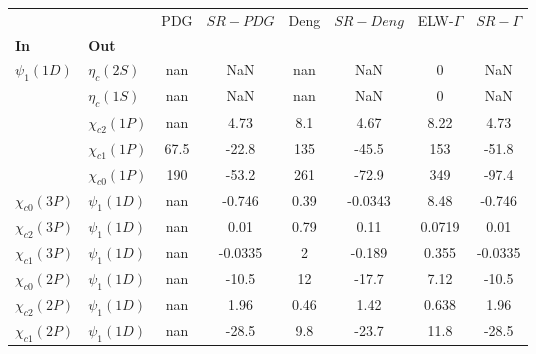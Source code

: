\begin{tabular}{l|l|c|c|c|c|c|c}
\toprule
                &                &  PDG & $SR-PDG$ &  Deng & $SR-Deng$ &  ELW-$\Gamma$ & $SR-\Gamma$ \\
\textbf{In} & \textbf{Out} &      &          &       &           &               &             \\
\midrule
\textbf{$\psi_{1}(1D)$} & \textbf{$\eta_{c}(2S)$} &  nan &      NaN &   nan &       NaN &             0 &         NaN \\
                & \textbf{$\eta_{c}(1S)$} &  nan &      NaN &   nan &       NaN &             0 &         NaN \\
                & \textbf{$\chi_{c2}(1P)$} &  nan &     4.73 &   8.1 &      4.67 &          8.22 &        4.73 \\
                & \textbf{$\chi_{c1}(1P)$} & 67.5 &    -22.8 &   135 &     -45.5 &           153 &       -51.8 \\
                & \textbf{$\chi_{c0}(1P)$} &  190 &    -53.2 &   261 &     -72.9 &           349 &       -97.4 \\
\textbf{$\chi_{c0}(3P)$} & \textbf{$\psi_{1}(1D)$} &  nan &   -0.746 &  0.39 &   -0.0343 &          8.48 &      -0.746 \\
\textbf{$\chi_{c2}(3P)$} & \textbf{$\psi_{1}(1D)$} &  nan &     0.01 &  0.79 &      0.11 &        0.0719 &        0.01 \\
\textbf{$\chi_{c1}(3P)$} & \textbf{$\psi_{1}(1D)$} &  nan &  -0.0335 &     2 &    -0.189 &         0.355 &     -0.0335 \\
\textbf{$\chi_{c0}(2P)$} & \textbf{$\psi_{1}(1D)$} &  nan &    -10.5 &    12 &     -17.7 &          7.12 &       -10.5 \\
\textbf{$\chi_{c2}(2P)$} & \textbf{$\psi_{1}(1D)$} &  nan &     1.96 &  0.46 &      1.42 &         0.638 &        1.96 \\
\textbf{$\chi_{c1}(2P)$} & \textbf{$\psi_{1}(1D)$} &  nan &    -28.5 &   9.8 &     -23.7 &          11.8 &       -28.5 \\
\bottomrule
\end{tabular}
